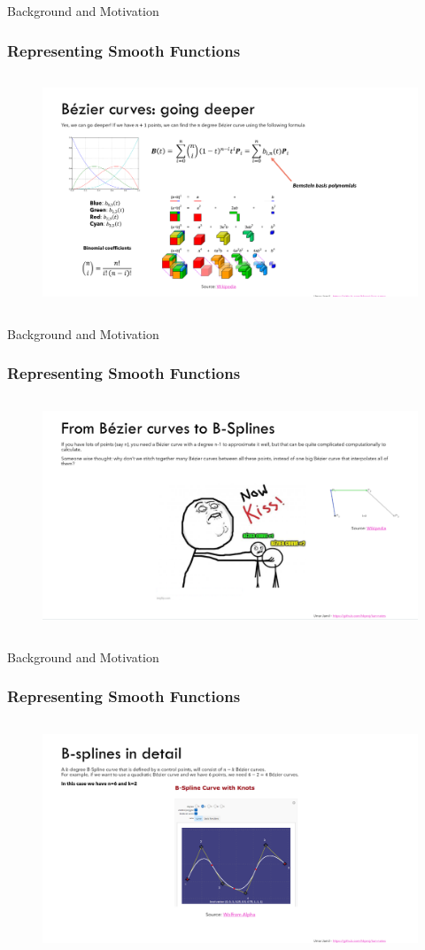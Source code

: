 \documentclass[serif, aspectratio=169]{beamer}
\begin{document}
\begin{frame}{Background and Motivation}
    \frametitle<presentation>{Representing Smooth Functions}
    \begin{figure}
        \centering
        \includegraphics[height=7cm]{image.png}
    \end{figure}
\end{frame}
\begin{frame}{Background and Motivation}
    \frametitle<presentation>{Representing Smooth Functions}
    \begin{figure}
        \centering
        \includegraphics[height=7cm]{image copy.png}
    \end{figure}
\end{frame}
\begin{frame}{Background and Motivation}
    \frametitle<presentation>{Representing Smooth Functions}
    \begin{figure}
        \centering
        \includegraphics[height=7cm]{image copy 2.png}
    \end{figure}
\end{frame}
\end{document}
